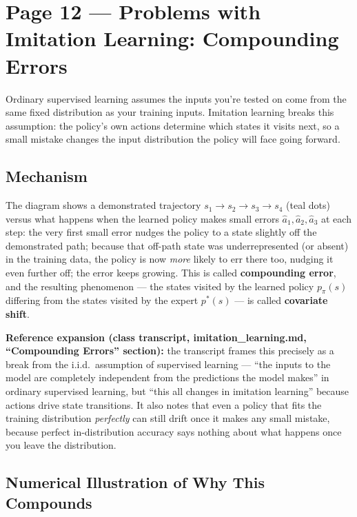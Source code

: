 \documentclass[11pt]{article}
\begin{document}
\section*{Page 12 --- Problems with Imitation Learning: Compounding Errors}

Ordinary supervised learning assumes the inputs you're tested on come from the same fixed distribution as your training inputs. Imitation learning breaks this assumption: the policy's own actions determine which states it visits next, so a small mistake changes the input distribution the policy will face going forward.

\subsection*{Mechanism}

The diagram shows a demonstrated trajectory $s_1 \to s_2 \to s_3 \to s_4$ (teal dots) versus what happens when the learned policy makes small errors $\hat a_1, \hat a_2, \hat a_3$ at each step: the very first small error nudges the policy to a state slightly off the demonstrated path; because that off-path state was underrepresented (or absent) in the training data, the policy is now \emph{more} likely to err there too, nudging it even further off; the error keeps growing. This is called \textbf{compounding error}, and the resulting phenomenon --- the states visited by the learned policy $p_\pi(s)$ differing from the states visited by the expert $p^*(s)$ --- is called \textbf{covariate shift}.

\textbf{Reference expansion (class transcript, imitation\_learning.md, ``Compounding Errors'' section):} the transcript frames this precisely as a break from the i.i.d.\ assumption of supervised learning --- ``the inputs to the model are completely independent from the predictions the model makes'' in ordinary supervised learning, but ``this all changes in imitation learning'' because actions drive state transitions. It also notes that even a policy that fits the training distribution \emph{perfectly} can still drift once it makes any small mistake, because perfect in-distribution accuracy says nothing about what happens once you leave the distribution.

\subsection*{Numerical Illustration of Why This Compounds}
\end{document}
